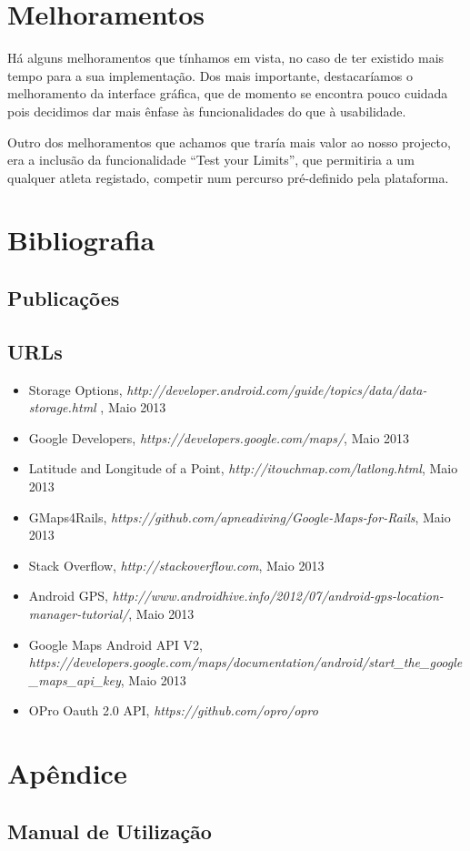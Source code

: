 \documentclass[15pt,a4paper]{article}
\begin{document}
\section{Melhoramentos}

Há alguns melhoramentos que tínhamos em vista, no caso de ter existido mais tempo para a sua implementação. Dos mais importante, destacaríamos o melhoramento da interface gráfica, que de momento se encontra pouco cuidada pois decidimos dar mais ênfase às funcionalidades do que à usabilidade.

Outro dos melhoramentos que achamos que traría mais valor ao nosso projecto, era a inclusão da funcionalidade “Test your Limits”, que permitiria a um qualquer atleta registado, competir num percurso pré-definido pela plataforma.

\section{Bibliografia}

\subsection{Publicações}

\subsection{URLs}

\begin{itemize}
\item Storage Options, \emph{http://developer.android.com/guide/topics/data/data-storage.html
}, Maio 2013
\item Google Developers, \emph{https://developers.google.com/maps/}, Maio 2013

\item Latitude and Longitude of a Point, \emph{http://itouchmap.com/latlong.html}, Maio 2013
\item GMaps4Rails, \emph{https://github.com/apneadiving/Google-Maps-for-Rails}, Maio 2013

\item Stack Overflow, \emph{http://stackoverflow.com}, Maio 2013

\item Android GPS, \emph{http://www.androidhive.info/2012/07/android-gps-location-manager-tutorial/}, Maio 2013

\item Google Maps Android API V2, \emph{https://developers.google.com/maps/documentation/android/start\_the\_google\_maps\_api\_key}, Maio 2013

\item OPro Oauth 2.0 API, \emph{https://github.com/opro/opro}

\end{itemize}



\newpage
\appendix
\section{Apêndice}
\subsection{Manual de Utilização}
\end{document}
